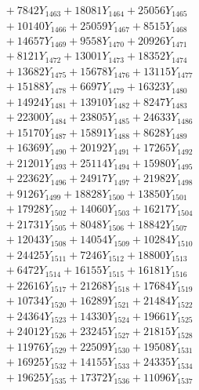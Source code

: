 \documentclass[a4paper,10pt]{article}
\begin{document}
{\begin{align}
&\;  + 7842 Y_{1463} + 18081 Y_{1464} + 25056 Y_{1465} \\[0.3ex]
&\;  + 10140 Y_{1466} + 25059 Y_{1467} + 8515 Y_{1468} \\[0.5ex]\allowbreak
&\;  + 14657 Y_{1469} + 9558 Y_{1470} + 20926 Y_{1471} \\[0.3ex]
&\;  + 8121 Y_{1472} + 13001 Y_{1473} + 18352 Y_{1474} \\[0.3ex]
&\;  + 13682 Y_{1475} + 15678 Y_{1476} + 13115 Y_{1477} \\[0.3ex]
&\;  + 15188 Y_{1478} + 6697 Y_{1479} + 16323 Y_{1480} \\[0.3ex]
&\;  + 14924 Y_{1481} + 13910 Y_{1482} + 8247 Y_{1483} \\[0.3ex]
&\;  + 22300 Y_{1484} + 23805 Y_{1485} + 24633 Y_{1486} \\[0.3ex]
&\;  + 15170 Y_{1487} + 15891 Y_{1488} + 8628 Y_{1489} \\[0.3ex]
&\;  + 16369 Y_{1490} + 20192 Y_{1491} + 17265 Y_{1492} \\[0.3ex]
&\;  + 21201 Y_{1493} + 25114 Y_{1494} + 15980 Y_{1495} \\[0.3ex]
&\;  + 22362 Y_{1496} + 24917 Y_{1497} + 21982 Y_{1498} \\[0.5ex]\allowbreak
&\;  + 9126 Y_{1499} + 18828 Y_{1500} + 13850 Y_{1501} \\[0.3ex]
&\;  + 17928 Y_{1502} + 14060 Y_{1503} + 16217 Y_{1504} \\[0.3ex]
&\;  + 21731 Y_{1505} + 8048 Y_{1506} + 18842 Y_{1507} \\[0.3ex]
&\;  + 12043 Y_{1508} + 14054 Y_{1509} + 10284 Y_{1510} \\[0.3ex]
&\;  + 24425 Y_{1511} + 7246 Y_{1512} + 18800 Y_{1513} \\[0.3ex]
&\;  + 6472 Y_{1514} + 16155 Y_{1515} + 16181 Y_{1516} \\[0.3ex]
&\;  + 22616 Y_{1517} + 21268 Y_{1518} + 17684 Y_{1519} \\[0.3ex]
&\;  + 10734 Y_{1520} + 16289 Y_{1521} + 21484 Y_{1522} \\[0.3ex]
&\;  + 24364 Y_{1523} + 14330 Y_{1524} + 19661 Y_{1525} \\[0.3ex]
&\;  + 24012 Y_{1526} + 23245 Y_{1527} + 21815 Y_{1528} \\[0.5ex]\allowbreak
&\;  + 11976 Y_{1529} + 22509 Y_{1530} + 19508 Y_{1531} \\[0.3ex]
&\;  + 16925 Y_{1532} + 14155 Y_{1533} + 24335 Y_{1534} \\[0.3ex]
&\;  + 19625 Y_{1535} + 17372 Y_{1536} + 11096 Y_{1537} \\[0.3ex]

\end{align}}
\end{document}
